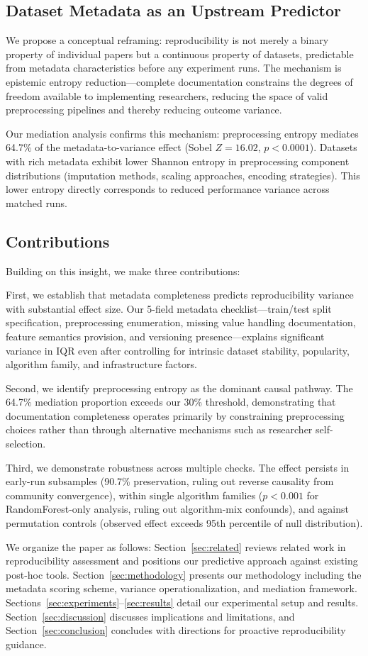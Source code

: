 \subsection{Dataset Metadata as an Upstream Predictor}

We propose a conceptual reframing: reproducibility is not merely a binary property of individual papers but a continuous property of datasets, predictable from metadata characteristics before any experiment runs. The mechanism is epistemic entropy reduction---complete documentation constrains the degrees of freedom available to implementing researchers, reducing the space of valid preprocessing pipelines and thereby reducing outcome variance.

Our mediation analysis confirms this mechanism: preprocessing entropy mediates 64.7\% of the metadata-to-variance effect (Sobel $Z = 16.02$, $p < 0.0001$). Datasets with rich metadata exhibit lower Shannon entropy in preprocessing component distributions (imputation methods, scaling approaches, encoding strategies). This lower entropy directly corresponds to reduced performance variance across matched runs.

\subsection{Contributions}

Building on this insight, we make three contributions:

First, we establish that metadata completeness predicts reproducibility variance with substantial effect size. Our 5-field metadata checklist---train/test split specification, preprocessing enumeration, missing value handling documentation, feature semantics provision, and versioning presence---explains significant variance in IQR even after controlling for intrinsic dataset stability, popularity, algorithm family, and infrastructure factors.

Second, we identify preprocessing entropy as the dominant causal pathway. The 64.7\% mediation proportion exceeds our 30\% threshold, demonstrating that documentation completeness operates primarily by constraining preprocessing choices rather than through alternative mechanisms such as researcher self-selection.

Third, we demonstrate robustness across multiple checks. The effect persists in early-run subsamples (90.7\% preservation, ruling out reverse causality from community convergence), within single algorithm families ($p < 0.001$ for RandomForest-only analysis, ruling out algorithm-mix confounds), and against permutation controls (observed effect exceeds 95th percentile of null distribution).

We organize the paper as follows: Section~\ref{sec:related} reviews related work in reproducibility assessment and positions our predictive approach against existing post-hoc tools. Section~\ref{sec:methodology} presents our methodology including the metadata scoring scheme, variance operationalization, and mediation framework. Sections~\ref{sec:experiments}--\ref{sec:results} detail our experimental setup and results. Section~\ref{sec:discussion} discusses implications and limitations, and Section~\ref{sec:conclusion} concludes with directions for proactive reproducibility guidance.
